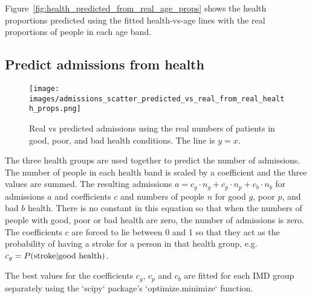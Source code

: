 \documentclass[12pt]{extarticle}
\begin{document}
Figure~\ref{fig:health_predicted_from_real_age_props} shows the health proportions predicted using the fitted health-vs-age lines with the real proportions of people in each age band.

\subsection{Predict admissions from health}

\begin{figure}
    \centering
    \texttt{[image: images/admissions\_scatter\_predicted\_vs\_real\_from\_real\_health\_props.png]}
    \caption{Real vs predicted admissions using the real numbers of patients in good, poor, and bad health conditions. The line is $y=x$.}
    \label{fig:admissions_predicted_from_real_health_props}
\end{figure}

The three health groups are used together to predict the number of admissions.
The number of people in each health band is scaled by a coefficient and the three values are summed.
The resulting admissions $a = c_g \cdot n_g + c_p \cdot n_p + c_b \cdot n_b$ for admissions $a$ and coefficients $c$ and numbers of people $n$ for good $g$, poor $p$, and bad $b$ health.
There is no constant in this equation so that when the numbers of people with good, poor or bad health are zero, the number of admissions is zero.
The coefficients $c$ are forced to lie between 0 and 1 so that they act as the probability of having a stroke for a person in that health group, e.g. $c_g = P(\textnormal{stroke} | \textnormal{good health})$.

The best values for the coefficients $c_g$, $c_p$ and $c_b$ are fitted for each IMD group separately using the `scipy` package's `optimize.minimize` function.
\end{document}
